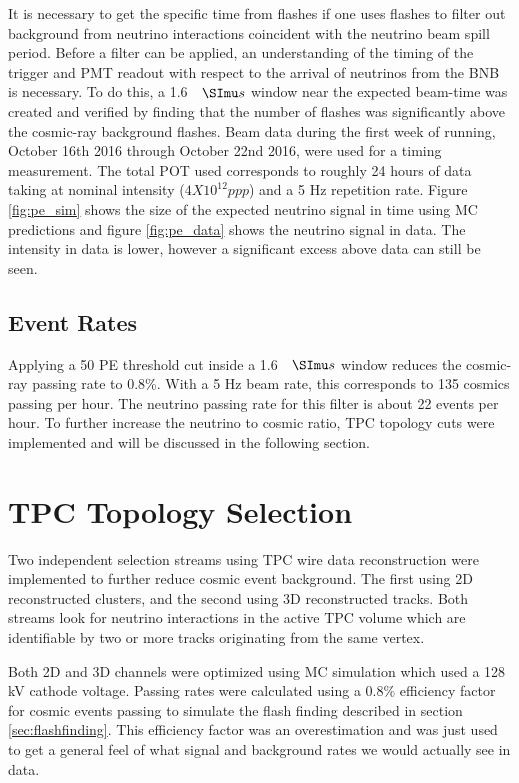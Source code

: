 It is necessary to get the specific time from flashes if one uses flashes to filter out background from neutrino interactions coincident with the neutrino beam spill period. Before a filter can be applied, an understanding of the timing of the trigger and PMT readout with respect to the arrival of neutrinos from the BNB is necessary. To do this, a 1.6 $\micro s$ window near the expected beam-time was created and verified by finding that the number of flashes was significantly above the cosmic-ray background flashes. Beam data during the first week of running, October 16th 2016 through October 22nd 2016, were used for a timing measurement. The total POT used corresponds to roughly 24 hours of data taking at nominal intensity ($4 X 10^{12} ppp$) and a 5 Hz repetition rate. Figure \ref{fig:pe_sim} shows the size of the expected neutrino signal in time using MC predictions and figure \ref{fig:pe_data} shows the neutrino signal in data. The intensity in data is lower, however a significant excess above data can still be seen.

\subsection{Event Rates}
Applying a 50 PE threshold cut inside a 1.6 $\micro s$ window reduces the cosmic-ray passing rate to 0.8\%. With a 5 Hz beam rate, this corresponds to 135 cosmics passing per hour. The neutrino passing rate for this filter is about 22 events per hour. To further increase the neutrino to cosmic ratio, TPC topology cuts were implemented and will be discussed in the following section.
\section{TPC Topology Selection}  
Two independent selection streams using TPC wire data reconstruction were implemented to further reduce cosmic event background. The first using 2D reconstructed clusters, and the second using 3D reconstructed tracks. Both streams look for neutrino interactions in the active TPC volume which are identifiable by two or more tracks originating from the same vertex.

Both 2D and 3D channels were optimized using MC simulation which used a 128 kV cathode voltage. Passing rates were calculated using a 0.8\% efficiency factor for cosmic events passing to simulate the flash finding described in section \ref{sec:flashfinding}. This efficiency factor was an overestimation and was just used to get a general feel of what signal and background rates we would actually see in data. 
